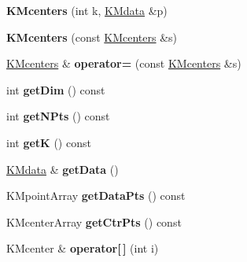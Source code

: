 \begin{DoxyCompactItemize}
\item 
\hypertarget{class_k_mcenters_a3c66312b8fd1c4d74456993334f213f8}{
{\bfseries KMcenters} (int k, \hyperlink{class_k_mdata}{KMdata} \&p)}
\label{class_k_mcenters_a3c66312b8fd1c4d74456993334f213f8}

\item 
\hypertarget{class_k_mcenters_a2e7882a22e4ba5169876699583699728}{
{\bfseries KMcenters} (const \hyperlink{class_k_mcenters}{KMcenters} \&s)}
\label{class_k_mcenters_a2e7882a22e4ba5169876699583699728}

\item 
\hypertarget{class_k_mcenters_ad6a67334afae53ca9d92f2f45ca72509}{
\hyperlink{class_k_mcenters}{KMcenters} \& {\bfseries operator=} (const \hyperlink{class_k_mcenters}{KMcenters} \&s)}
\label{class_k_mcenters_ad6a67334afae53ca9d92f2f45ca72509}

\item 
\hypertarget{class_k_mcenters_a8bb9b4e6d673042aac5f73c8f5169a17}{
int {\bfseries getDim} () const }
\label{class_k_mcenters_a8bb9b4e6d673042aac5f73c8f5169a17}

\item 
\hypertarget{class_k_mcenters_a885153552ea70f53d00fc5d3982615a8}{
int {\bfseries getNPts} () const }
\label{class_k_mcenters_a885153552ea70f53d00fc5d3982615a8}

\item 
\hypertarget{class_k_mcenters_af0f0d1000eabdfa259f754aa458e202c}{
int {\bfseries getK} () const }
\label{class_k_mcenters_af0f0d1000eabdfa259f754aa458e202c}

\item 
\hypertarget{class_k_mcenters_afb15eb018d4c55f30ea6ac4c275ca344}{
\hyperlink{class_k_mdata}{KMdata} \& {\bfseries getData} ()}
\label{class_k_mcenters_afb15eb018d4c55f30ea6ac4c275ca344}

\item 
\hypertarget{class_k_mcenters_a0c397ae473520b0ba093c16f6bcfc9f8}{
KMpointArray {\bfseries getDataPts} () const }
\label{class_k_mcenters_a0c397ae473520b0ba093c16f6bcfc9f8}

\item 
\hypertarget{class_k_mcenters_ac435c9b28c9dffad3b4d44ff59f3c50f}{
KMcenterArray {\bfseries getCtrPts} () const }
\label{class_k_mcenters_ac435c9b28c9dffad3b4d44ff59f3c50f}

\item 
\hypertarget{class_k_mcenters_a6b0d81e3508b3e6e89eb6dc869000679}{
KMcenter \& {\bfseries operator\mbox{[}$\,$\mbox{]}} (int i)}
\label{class_k_mcenters_a6b0d81e3508b3e6e89eb6dc869000679}


\end{DoxyCompactItemize}
